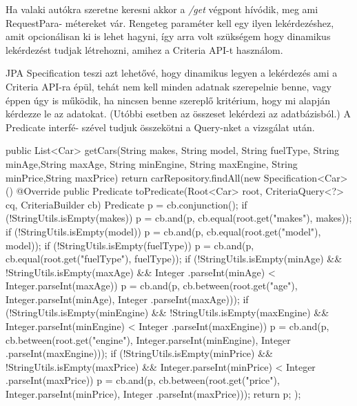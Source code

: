 
Ha valaki autókra szeretne keresni akkor a \textit{/get} végpont hívódik, meg ami RequestPara-
métereket vár. Rengeteg paraméter kell egy ilyen lekérdezéshez, amit opcionálisan ki is lehet hagyni, így arra volt szükségem hogy dinamikus lekérdezést tudjak létrehozni, amihez a Criteria API-t használom.

JPA Specification teszi azt lehetővé, hogy dinamikus legyen a lekérdezés ami a Criteria API-ra épül, tehát nem kell minden adatnak szerepelnie benne, vagy éppen úgy is működik, ha nincsen benne szereplő kritérium, hogy mi alapján kérdezze le az adatokat. (Utóbbi esetben az összeset lekérdezi az adatbázisból.) A Predicate interfé-
szével tudjuk összekötni a Query-nket a vizsgálat után.

\begin{java}
public List<Car> getCars(String makes, String model,
      String fuelType, String minAge,String maxAge,
      String minEngine, String maxEngine, 
      String minPrice,String maxPrice) {
  return carRepository.findAll(new Specification<Car>() {
    @Override
    public Predicate toPredicate(Root<Car> root,
     CriteriaQuery<?> cq, CriteriaBuilder cb) {
        Predicate p = cb.conjunction();
        if (!StringUtils.isEmpty(makes)) {
            p = cb.and(p, cb.equal(root.get("makes"), makes));
        }
        if (!StringUtils.isEmpty(model)) {
            p = cb.and(p, cb.equal(root.get("model"), model));
        }
        if (!StringUtils.isEmpty(fuelType)) {
            p = cb.and(p, cb.equal(root.get("fuelType"),
                                        fuelType));
        }
        if (!StringUtils.isEmpty(minAge) && 
            !StringUtils.isEmpty(maxAge) &&
            Integer
            .parseInt(minAge) < Integer.parseInt(maxAge)) {
            p = cb.and(p, cb.between(root.get("age"),
            Integer.parseInt(minAge), Integer
                                    .parseInt(maxAge)));
        }
        if (!StringUtils.isEmpty(minEngine) &&
            !StringUtils.isEmpty(maxEngine) &&
            Integer.parseInt(minEngine) < Integer
                                       .parseInt(maxEngine)) {
            p = cb.and(p, cb.between(root.get("engine"),
            Integer.parseInt(minEngine), Integer
                                       .parseInt(maxEngine)));
        }
        if (!StringUtils.isEmpty(minPrice) &&
            !StringUtils.isEmpty(maxPrice) &&
            Integer.parseInt(minPrice) < Integer
                                      .parseInt(maxPrice)) {
             p = cb.and(p, cb.between(root.get("price"),
             Integer.parseInt(minPrice), Integer
                                       .parseInt(maxPrice)));
        }
        return p;
     }
  });
}
\end{java}

